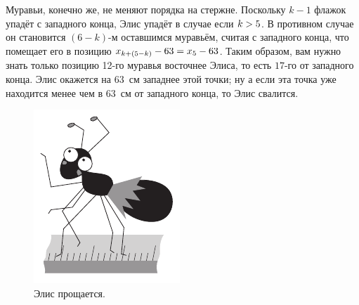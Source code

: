 Муравьи, конечно же, не меняют порядка на стержне.
Поскольку $k-1$ флажок упадёт с западного конца, Элис упадёт в случае если $k\z> 5$.
В противном случае он становится $(6-k)$-м оставшимся муравьём, считая с западного конца, что помещает его в позицию $x_{k+(5-k)}-63\z=x_5-63$.
Таким образом, вам нужно знать только позицию 12-го муравья восточнее Элиса, то есть $17$-го от западного конца.
Элис окажется на $63$~см западнее этой точки; ну а если эта точка уже находится менее чем в $63$~см от западного конца, то Элис свалится.

\begin{figure}[ht!]
\centering
\includegraphics[scale=.7]{pics/alice2}
\caption{Элис прощается.}
\label{pic:alice2}
\end{figure}
